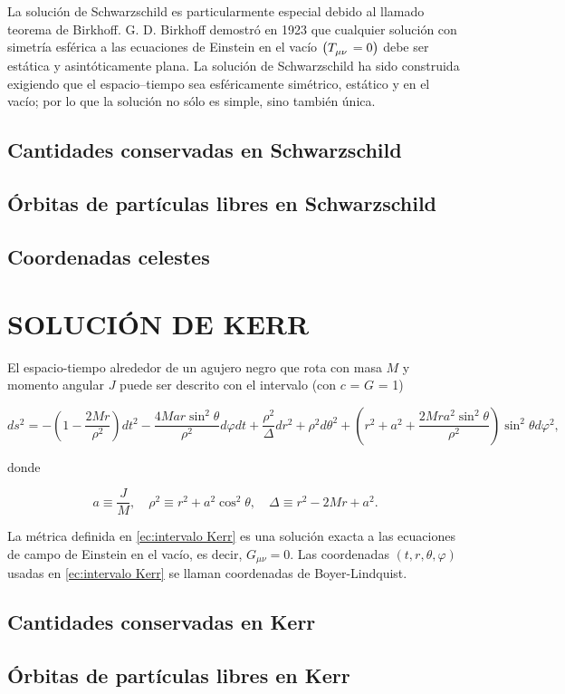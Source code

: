 \documentclass[11pt]{article}
\begin{document}
La solución de Schwarzschild es particularmente especial debido al llamado teorema de Birkhoff. G. D. Birkhoff demostró en 1923 que cualquier solución con simetría esférica a las ecuaciones de Einstein en el vacío $ \left( \tensor{T}{_\mu_\nu} = 0 \right) $ debe ser estática y asintóticamente plana. La solución de Schwarzschild ha sido construida exigiendo que el espacio–tiempo sea esféricamente simétrico, estático y en el vacío; por lo que la solución no sólo es simple, sino también única.

\subsection{Cantidades conservadas en Schwarzschild}

\subsection{Órbitas de partículas libres en Schwarzschild}

\subsection{Coordenadas celestes}

\newpage

\section{SOLUCIÓN DE KERR}

El espacio-tiempo alrededor de un agujero negro que rota con masa $M$ y momento angular $J$ puede ser descrito con el intervalo (con $c$ = $G$ = 1)

\begin{equation}
ds^{2} = -\left( 1 - \dfrac{2Mr}{\rho^{2}} \right)dt^{2} - \dfrac{4Mar\sin^{2}\theta}{\rho^{2}}d\varphi dt + \dfrac{\rho^{2}}{\Delta}dr^{2} + \rho^{2}d\theta^{2} + \left( r^{2} + a^{2} + \dfrac{2Mra^{2}\sin^{2}\theta}{\rho^{2}} \right) \sin^{2}\theta d\varphi^{2},
\label{ec:intervalo Kerr}
\end{equation}

donde

\begin{equation}
a \equiv \dfrac{J}{M}, \quad \rho^{2} \equiv r^{2} + a^{2}\cos^{2}\theta, \quad \Delta \equiv r^{2} - 2Mr + a^{2}. 
\label{ec:definiciones en Kerr}
\end{equation}

La métrica definida en \eqref{ec:intervalo Kerr} es una solución exacta a las ecuaciones de campo de Einstein en el vacío, es decir, $G_{\mu\nu} = 0$. Las coordenadas $(t, r, \theta, \varphi)$ usadas en \eqref{ec:intervalo Kerr} se llaman coordenadas de Boyer-Lindquist. 

\subsection{Cantidades conservadas en Kerr}


\subsection{Órbitas de partículas libres en Kerr}

\newpage




	
\end{document}
